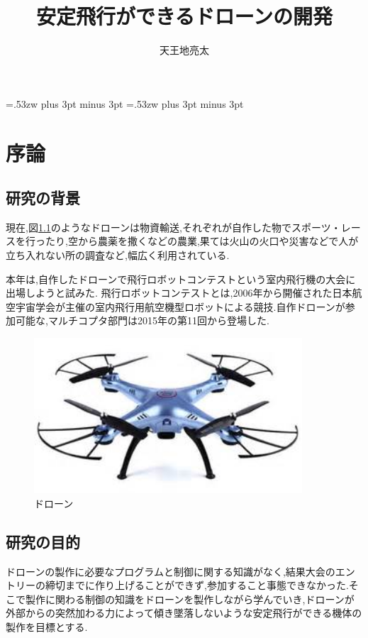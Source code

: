 \documentclass[12pt,oneside]{paper}
\title{安定飛行ができるドローンの開発}
\author{天王地亮太}
\begin{document}
\setlength{\baselineskip}{9truemm}

\kanjiskip=.53zw plus 3pt minus 3pt
\xkanjiskip=.53zw plus 3pt minus 3pt

\tableofcontents


\chapter{序論}
\section{研究の背景}
現在,図\ref{fig:doron}のようなドローンは物資輸送,それぞれが自作した物でスポーツ・レースを行ったり,空から農薬を撒くなどの農業,果ては火山の火口や災害などで人が立ち入れない所の調査など,幅広く利用されている.

本年は,自作したドローンで飛行ロボットコンテストという室内飛行機の大会に出場しようと試みた.
飛行ロボットコンテストとは,2006年から開催された日本航空宇宙学会が主催の室内飛行用航空機型ロボットによる競技.自作ドローンが参加可能な,マルチコプタ部門は2015年の第11回から登場した.

\begin{figure}[htbp]
  \begin{center}
    \includegraphics[width=100mm]{ga/doron.jpg}
    \end{center}
  \caption{ドローン}
 \label{fig:doron}
\end{figure}

\section{研究の目的}
ドローンの製作に必要なプログラムと制御に関する知識がなく,結果大会のエントリーの締切までに作り上げることができず,参加すること事態できなかった.そこで製作に関わる制御の知識をドローンを製作しながら学んでいき,ドローンが外部からの突然加わる力によって傾き墜落しないような安定飛行ができる機体の製作を目標とする.
\end{document}
